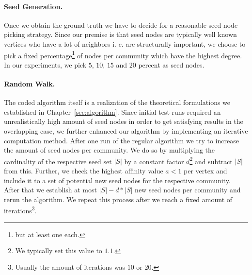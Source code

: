 \paragraph{Seed Generation.}
Once we obtain the ground truth we have to decide for a reasonable seed node 
picking strategy. Since our premise is that seed nodes are typically well known vertices who have a lot of neighbors i. e. are structurally important, we choose to pick a fixed percentage\footnote{but at least one each.} of nodes per community which have the highest degree. In our experiments, we pick $5$, $10$, $15$ and $20$ percent as seed nodes.

\paragraph{Random Walk.}
The coded algorithm itself is a realization of the theoretical formulations we 
established in Chapter~\ref{sec:algorithm}. Since initial test runs required an unrealistically high amount of seed nodes in order to get satisfying results in the overlapping case, we further enhanced our algorithm by implementing an iterative computation method. After one run of the regular algorithm we try to increase the amount of seed nodes per community. We do so by multiplying the cardinality of the respective seed set $\left| S \right|$ by a constant factor $d$\footnote{We typically set this value to $1.1$.} and subtract $\left| S \right|$ from this. Further, we check the highest affinity value $a < 1$ per vertex and include it to a set of potential new seed nodes for the respective community. After that we establish at most 
$\left| S \right| - d * \left| S \right|$ new seed nodes per community and rerun the algorithm. We repeat this process after we reach a fixed amount of 
iterations\footnote{Usually the amount of iterations was $10$ or $20$.}.

